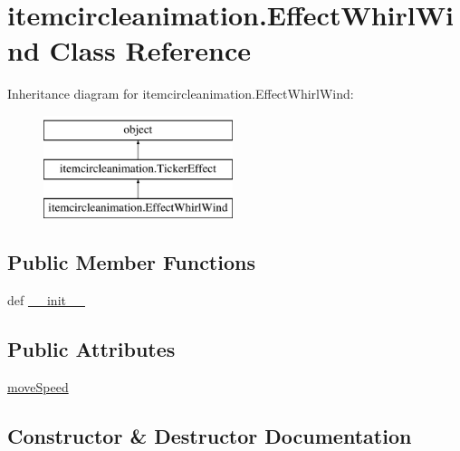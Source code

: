 \hypertarget{classitemcircleanimation_1_1EffectWhirlWind}{}\section{itemcircleanimation.\+Effect\+Whirl\+Wind Class Reference}
\label{classitemcircleanimation_1_1EffectWhirlWind}
Inheritance diagram for itemcircleanimation.\+Effect\+Whirl\+Wind\+:\begin{figure}[H]
\begin{center}
\leavevmode
\includegraphics[height=3.000000cm]{classitemcircleanimation_1_1EffectWhirlWind}
\end{center}
\end{figure}
\subsection*{Public Member Functions}
\begin{DoxyCompactItemize}
\item 
def \hyperlink{classitemcircleanimation_1_1EffectWhirlWind_a4972aa542a4ea87b0e89ab81b4237c4c}{\+\_\+\+\_\+init\+\_\+\+\_\+}
\end{DoxyCompactItemize}
\subsection*{Public Attributes}
\begin{DoxyCompactItemize}
\item 
\hyperlink{classitemcircleanimation_1_1EffectWhirlWind_abd71ac66c62e8a2b7e40b59d28bf1d0a}{move\+Speed}
\end{DoxyCompactItemize}


\subsection{Constructor \& Destructor Documentation}
\hypertarget{classitemcircleanimation_1_1EffectWhirlWind_a4972aa542a4ea87b0e89ab81b4237c4c}{}

